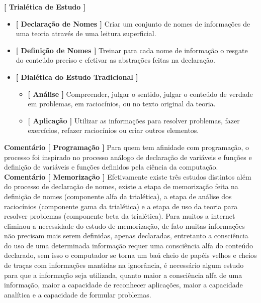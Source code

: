 \documentclass[10pt,a4paper]{report}
\begin{document}
\textbf{[ Trialética de Estudo ]} 

\begin{itemize}
	\item[ (i) ] \textbf{[ Declaração de Nomes ]} Criar um conjunto de nomes de informações de uma teoria através de uma leitura superficial.
	\item[ (ii) ] \textbf{[ Definição de Nomes ]} Treinar para cada nome de informação o resgate do conteúdo preciso e efetivar as abstrações feitas na declaração.
	\item[ (iii) ] \textbf{[ Dialética do Estudo Tradicional ]}
	\begin{itemize}
		\item[ (i) ] \textbf{[ Análise ]} Compreender, julgar o sentido, julgar o conteúdo de verdade em problemas, em raciocínios, ou no texto original da teoria.
		\item[ (ii) ] \textbf{[ Aplicação ]} Utilizar as informações para resolver problemas, fazer exercícios, refazer raciocínios ou criar outros elementos.
	\end{itemize}
\end{itemize}

\textbf{Comentário [ Programação ]} Para quem tem afinidade com programação, o processo foi inspirado no processo análogo de declaração de variáveis e funções e definição de variáveis e funções definidos pela ciência da computação.\\

\textbf{Comentário [ Memorização ]} Efetivamente existe três estudos distintos além do processo de declaração de nomes, existe a etapa de memorização feita na definição de nomes (componente alfa da trialética), a etapa de análise dos raciocínios (componente gama da trialética) e a etapa de uso da teoria para resolver problemas (componente beta da trialética). Para muitos a internet eliminou a necessidade do estudo de memorização, de fato muitas informações não precisam mais serem definidas, apenas declaradas, entretanto a consciência do uso de uma determinada informação requer uma consciência alfa do conteúdo declarado, sem isso o computador se torna um baú cheio de papéis velhos e cheios de traças com informações mantidas na ignorância, é necessário algum estudo para que a informação seja utilizada, quanto maior a consciência alfa de uma informação, maior a capacidade de reconhecer aplicações, maior a capacidade analítica e a capacidade de formular problemas.\\
\end{document}
